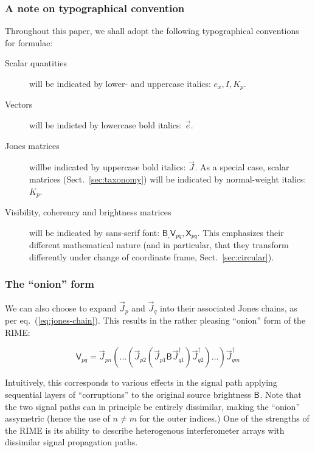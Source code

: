 \documentclass[]{aa}
\newcommand{\jones}[2]{\vec {#1}_{#2}}
\newcommand{\jonesT}[2]{\vec {#1}^\dagger_{#2}}
\newcommand{\coh}[2]{\mathsf{{#1}}_{{#2}}}
\begin{document}
\subsubsection{A note on typographical convention}

Throughout this paper, we shall adopt the following typographical conventions for formulae:

\begin{description}
\item[Scalar quantities] will be indicated by lower- and uppercase italics: $e_x,I,K_p$.
\item[Vectors] will be indicted by lowercase bold italics: $\vec e$.
\item[Jones matrices] willbe indicated by uppercase bold italics: $\jones{J}{}$. As a special case, scalar matrices
(Sect.~\ref{sec:taxonomy}) will be indicated by normal-weight italics: $K_p$.
\item[Visibility, coherency and brightness matrices] will be indicated by sans-serif font: 
$\coh{B}, \coh{V}{pq}, \coh{X}{pq}$. This emphasizes their different mathematical nature (and in particular, that they transform differently under change of coordinate frame, Sect.~\ref{sec:circular}).
\end{description}


\subsubsection{The ``onion'' form}

We can also choose to expand $\jones{J}{p}$ and $\jones{J}{q}$ into their associated Jones chains, as per 
eq.~(\ref{eq:jones-chain}). This results in the rather pleasing ``onion'' form of the RIME:

    \begin{equation}\label{eq:me0-onion}
    \coh{V}{pq} = \jones{J}{pn}(...(\jones{J}{p2} (\jones{J}{p1} \coh{B}{}  \jones{J}{q1}^\dagger)\jonesT{J}{q2}) ... )\jonesT{J}{qm}
    \end{equation}

Intuitively, this corresponds to various effects in the signal path applying sequential layers of ``corruptions'' to the original source brightness $\coh{B}{}$. Note that the two signal paths can in principle be entirely dissimilar, making the ``onion'' assymetric (hence the use of $n\ne m$ for the outer indices.) One of the strengths of the RIME is its ability to describe heterogenous interferometer arrays with dissimilar signal propagation paths.
\end{document}

